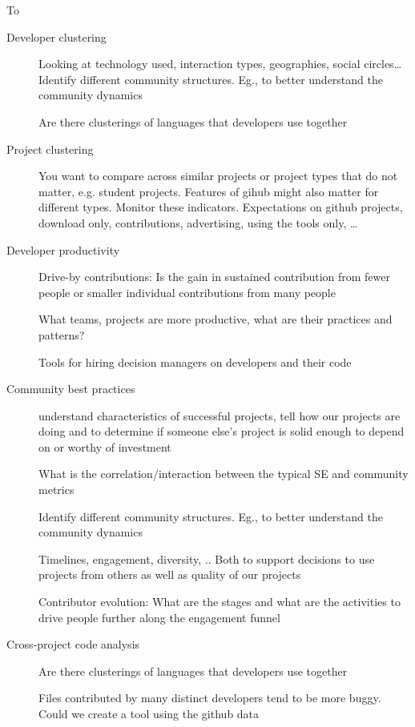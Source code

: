 \documentclass{sig-alternate}
\begin{document}
To 

\begin{description}

  \item[Developer clustering] Looking at technology used, interaction types, geographies, social circles…
    Identify different community structures.  Eg., to better understand the community dynamics

    Are there clusterings of languages that developers use together


  \item[Project clustering]

    You want to compare across similar projects or project types that do not matter, e.g. student projects. Features of gihub might also matter for different types. Monitor these indicators.
Expectations on github projects, download only, contributions, advertising, using the tools only, …


  \item[Developer productivity] Drive-by contributions: Is the gain in sustained contribution from fewer people or smaller individual contributions from many people

  What teams, projects are more productive, what are their practices and patterns?

Tools for hiring decision managers on developers and their code


  \item[Community best practices]

understand characteristics of successful projects, tell how our projects are doing and to determine if someone else’s project is solid enough to depend on or worthy of investment

What is the correlation/interaction between the typical SE and community metrics

Identify different community structures.  Eg., to better understand the community dynamics

Timelines, engagement, diversity, .. Both to support decisions to use projects from others as well as quality of our projects

Contributor evolution: What are the stages and what are the activities to drive people further along the engagement funnel


  \item[Cross-project code analysis]
Are there clusterings of languages that developers use together

Files contributed by many distinct developers tend to be more buggy.  Could we create a tool using the github data


\end{description}
\end{document}
